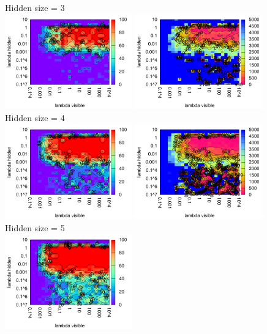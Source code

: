 \begin{figure}[H]
  \centering
  Hidden size = 3 \\
  \includegraphics[width=0.49\textwidth]{img/k3/tlr-3-success.pdf} 
  \includegraphics[width=0.49\textwidth]{img/k3/tlr-3-epoch.pdf}   
  Hidden size = 4 \\
  \includegraphics[width=0.49\textwidth]{img/k3/tlr-4-success.pdf} 
  \includegraphics[width=0.49\textwidth]{img/k3/tlr-4-epoch.pdf}   
  Hidden size = 5 \\
  \includegraphics[width=0.49\textwidth]{img/k3/tlr-5-success.pdf}   

\end{figure}
